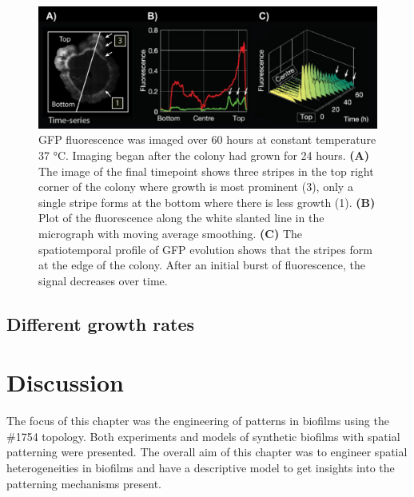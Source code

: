 \begin{figure}[H] %
    \centering
    \begin{adjustbox}{center}
        \includegraphics[width=1.1\textwidth]{chapters/Chapter 3/microscopy_timeseries} %
    \end{adjustbox}
    \caption{GFP fluorescence was imaged over 60 hours at constant temperature 37 °C. Imaging began after the colony had grown for 24 hours. \textbf{(A)} The image of the final timepoint shows three stripes in the top right corner of the colony where growth is most prominent (3), only a single stripe forms at the bottom where there is less growth (1). \textbf{(B)} Plot of the fluorescence along the white slanted line in the micrograph with moving average smoothing. \textbf{(C)} The spatiotemporal profile of GFP evolution shows that the stripes form at the edge of the colony. After an initial burst of fluorescence, the signal decreases over time.}
    \label{fig:microscopy_timeseries}
\end{figure}

\subsection{Different growth rates}

\section{Discussion}
The focus of this chapter was the engineering of patterns in biofilms using the \#1754 topology.
Both experiments and models of synthetic biofilms with spatial patterning were presented.
The overall aim of this chapter was to engineer spatial heterogeneities in biofilms and have a descriptive model to get insights into the patterning mechanisms present.

